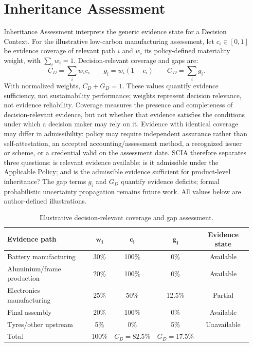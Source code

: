 \documentclass[english]{lni}
\begin{document}
\section{Inheritance Assessment}
Inheritance Assessment interprets the generic evidence state for a Decision Context. For the illustrative low-carbon manufacturing assessment, let $c_i\in[0,1]$ be evidence coverage of relevant path $i$ and $w_i$ its policy-defined materiality weight, with $\sum_iw_i=1$. Decision-relevant coverage and gaps are:
\[
C_D=\sum_i w_i c_i \qquad g_i=w_i(1-c_i) \qquad G_D=\sum_i g_i.
\]
With normalized weights, $C_D+G_D=1$. These values quantify evidence sufficiency, not sustainability performance; weights represent decision relevance, not evidence reliability. Coverage measures the presence and completeness of decision-relevant evidence, but not whether that evidence satisfies the conditions under which a decision maker may rely on it. Evidence with identical coverage may differ in admissibility: policy may require independent assurance rather than self-attestation, an accepted accounting/assessment method, a recognized issuer or scheme, or a credential valid on the assessment date. SCIA therefore separates three questions: is relevant evidence available; is it admissible under the Applicable Policy; and is the admissible evidence sufficient for product-level inheritance? The gap terms $g_i$ and $G_D$ quantify evidence deficits; formal probabilistic uncertainty propagation remains future work. All values below are author-defined illustrations.

\begin{table}[ht]
\centering
\caption{Illustrative decision-relevant coverage and gap assessment.}
\small
\begin{tabularx}{\textwidth}{Xcccc}
\toprule
\textbf{Evidence path} & $\mathbf{w_i}$ & $\mathbf{c_i}$ & $\mathbf{g_i}$ & \textbf{Evidence state}\\
\midrule
Battery manufacturing & 30\% & 100\% & 0\% & Available\\
Aluminium/frame production & 20\% & 100\% & 0\% & Available\\
Electronics manufacturing & 25\% & 50\% & 12.5\% & Partial\\
Final assembly & 20\% & 100\% & 0\% & Available\\
Tyres/other upstream & 5\% & 0\% & 5\% & Unavailable\\
\midrule
Total & 100\% & $C_D=82.5\%$ & $G_D=17.5\%$ & --\\
\bottomrule
\end{tabularx}
\end{table}
\end{document}
